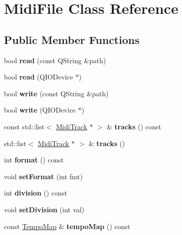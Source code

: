 \hypertarget{class_midi_file}{}\section{Midi\+File Class Reference}
\label{class_midi_file}
\subsection*{Public Member Functions}
\begin{DoxyCompactItemize}
\item 
\mbox{\label{class_midi_file_ab97ac3c329c144fc091d46a28476f697}} 
bool {\bfseries read} (const Q\+String \&path)
\item 
\mbox{\label{class_midi_file_a8a1ac2ced9288846596cd5b2d18abe87}} 
bool {\bfseries read} (Q\+I\+O\+Device $\ast$)
\item 
\mbox{\label{class_midi_file_a3842d8a3598d2845d7ee7936e51ab106}} 
bool {\bfseries write} (const Q\+String \&path)
\item 
\mbox{\label{class_midi_file_a05ed269ba1eaa3070c82361869c77c0d}} 
bool {\bfseries write} (Q\+I\+O\+Device $\ast$)
\item 
\mbox{\label{class_midi_file_a67b891f452959bc7622a9490a0078452}} 
const std\+::list$<$ \hyperlink{class_midi_track}{Midi\+Track} $\ast$ $>$ \& {\bfseries tracks} () const
\item 
\mbox{\label{class_midi_file_a8ed6c3b92a2991ddbffa3b39b288fe13}} 
std\+::list$<$ \hyperlink{class_midi_track}{Midi\+Track} $\ast$ $>$ \& {\bfseries tracks} ()
\item 
\mbox{\label{class_midi_file_a4259956087abc82f9b1f3a668874664c}} 
int {\bfseries format} () const
\item 
\mbox{\label{class_midi_file_a7768f4400750631ecb3c1d6b2fba1db7}} 
void {\bfseries set\+Format} (int fmt)
\item 
\mbox{\label{class_midi_file_adda9151e1ea1fba0d8222c2e7537ce6d}} 
int {\bfseries division} () const
\item 
\mbox{\label{class_midi_file_aece12b78e3c350bd35ed1a791c373f20}} 
void {\bfseries set\+Division} (int val)
\item 
\mbox{\label{class_midi_file_ad11eac6e7cda706187152e88665a36f6}} 
const \hyperlink{class_tempo_map}{Tempo\+Map} \& {\bfseries tempo\+Map} () const
\end{DoxyCompactItemize}
